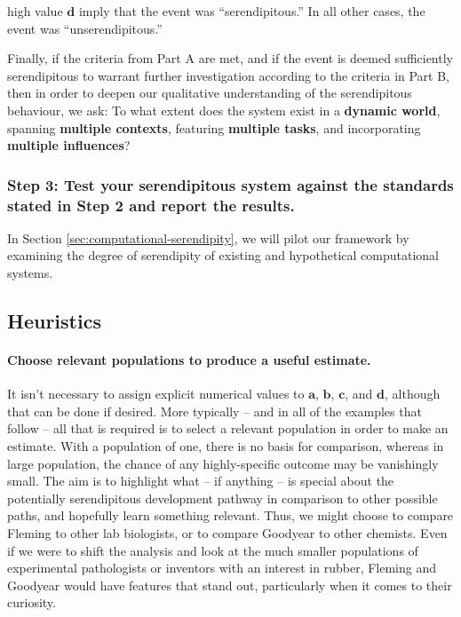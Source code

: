 \begin{description}[itemsep=16pt]
\begin{mdframed}
{  high value $\mathbf{d}$ imply that the event was ``serendipitous.''
  In all other cases, the event was ``unserendipitous.''}
\end{mdframed}
\item[{(\textbf{C - Factors})}] {Finally, if the criteria from Part A
  are met, and if the event is deemed sufficiently serendipitous to
  warrant further investigation according to the criteria in Part B,
  then in order to deepen our qualitative understanding of the
  serendipitous behaviour, we ask: To what extent does the system
  exist in a {\textbf{dynamic world}}, spanning {\textbf{multiple
      contexts}}, featuring {\textbf{multiple tasks}}, and
  incorporating {\textbf{multiple influences}}?}
\end{description}

\subsubsection*{Step 3: Test your serendipitous system against the standards stated in Step 2 and report the results.}

\noindent In Section \ref{sec:computational-serendipity}, we will pilot our framework by examining the degree of serendipity of existing and hypothetical computational systems. 

\subsection{Heuristics}\label{specs-heuristics}

\paragraph{Choose relevant populations to produce a useful
    estimate.}  It isn't necessary to assign explicit numerical
values to $\mathbf{a}$, $\mathbf{b}$, $\mathbf{c}$, and $\mathbf{d}$,
although that can be done if desired.  More typically -- and in all of
the examples that follow -- all that is required is to select a
relevant population in order to make an estimate.  With a population
of one, there is no basis for comparison, whereas in large population,
the chance of any highly-specific outcome may be vanishingly small.
The aim is to highlight what -- if anything -- is
special about the potentially serendipitous development pathway in
comparison to other possible paths, and hopefully learn something relevant.
Thus, we might choose to compare Fleming to other lab biologists,
or to compare Goodyear to other chemists.  Even if we were
to shift the analysis and look at the much smaller populations of
experimental pathologists or inventors with an interest in rubber,
Fleming and Goodyear would have features that stand out, particularly
when it comes to their curiosity.

